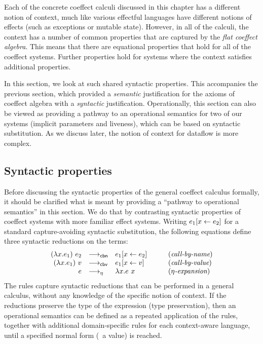Each of the concrete coeffect calculi discussed in this chapter has a different notion of context,
much like various effectful languages have different notions of effects (such as exceptions or
mutable state). However, in all of the calculi, the context has a number of common properties that
are captured by the \emph{flat coeffect algebra}. This means that there are equational properties
that hold for all of the coeffect systems. Further properties hold for systems where the context
satisfies additional properties.

In this section, we look at such shared syntactic properties. This accompanies the previous section,
which provided a \emph{semantic} justification for the axioms of coeffect algebra with a
\emph{syntactic} justification. Operationally, this section can also be viewed as providing a
pathway to an operational semantics for two of our systems (implicit parameters and liveness),
which can be based on syntactic substitution. As we discuss later, the notion of context for
dataflow is more complex.


\subsection{Syntactic properties}
\label{sec:flat-syntax-props}

Before discussing the syntactic properties of the general coeffect calculus formally, it should be
clarified what is meant by providing a ``pathway to operational semantics'' in this section. We do
that by contrasting syntactic properties of coeffect systems with more familiar effect systems.
Writing $e_1[x \leftarrow e_2]$ for a standard capture-avoiding syntactic substitution, the following
equations define three syntactic reductions on the terms:
%
\begin{equation*}
\begin{array}{rllcl}
(\lambda x.e_1)~e_2 &{\longrightarrow_{\textnormal{\sffamily cbn}}}& e_1[x \leftarrow e_2]   &&(\textit{call-by-name})\\
(\lambda x.e_1)~v   &{\longrightarrow_{\textnormal{\sffamily cbv}}}& e_1[x \leftarrow v]     &\quad&(\textit{call-by-value})\\
e &{\longrightarrow_\eta}& \lambda x.e~x                                    &&(\textit{$\eta$-expansion})
\end{array}
\end{equation*}
%
The rules capture syntactic reductions that can be performed in a general calculus, without any
knowledge of the specific notion of context. If the reductions preserve the type of the expression
(type preservation), then an operational semantics can be defined as a repeated application of the
rules, together with additional domain-specific rules for each context-aware language, until
a specified normal form (\ie~a value) is reached.

